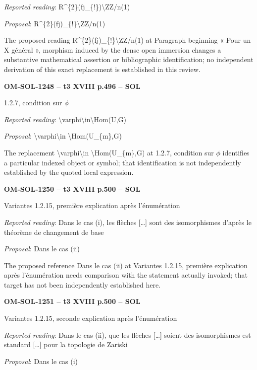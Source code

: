 \emph{Reported reading}: R\textasciicircum{}\{2\}(fj\_\{!\})\textbackslash{}ZZ/n(1)\par
\emph{Proposal}: R\textasciicircum{}\{2\}(fj)\_\{!\}\textbackslash{}ZZ/n(1)\par
The proposed reading R\textasciicircum{}\{2\}(fj)\_\{!\}\textbackslash{}ZZ/n(1) at Paragraph beginning « Pour un X général », morphism induced by the dense open immersion changes a substantive mathematical assertion or bibliographic identification; no independent derivation of this exact replacement is established in this review.\par
\par\noindent\textbf{OM-SOL-1248 -- t3 XVIII p.496 -- SOL}\par
1.2.7, condition sur \ensuremath{\phi}\par
\emph{Reported reading}: \textbackslash{}varphi\textbackslash{}in\textbackslash{}Hom(U,G)\par
\emph{Proposal}: \textbackslash{}varphi\textbackslash{}in \textbackslash{}Hom(U\_\{m\},G)\par
The replacement \textbackslash{}varphi\textbackslash{}in \textbackslash{}Hom(U\_\{m\},G) at 1.2.7, condition sur \ensuremath{\phi} identifies a particular indexed object or symbol; that identification is not independently established by the quoted local expression.\par
\par\noindent\textbf{OM-SOL-1250 -- t3 XVIII p.500 -- SOL}\par
Variantes 1.2.15, première explication après l'énumération\par
\emph{Reported reading}: Dans le cas (i), les flèches […] sont des isomorphismes d'après le théorème de changement de base\par
\emph{Proposal}: Dans le cas (ii)\par
The proposed reference Dans le cas (ii) at Variantes 1.2.15, première explication après l'énumération needs comparison with the statement actually invoked; that target has not been independently established here.\par
\par\noindent\textbf{OM-SOL-1251 -- t3 XVIII p.500 -- SOL}\par
Variantes 1.2.15, seconde explication après l'énumération\par
\emph{Reported reading}: Dans le cas (ii), que les flèches […] soient des isomorphismes est standard […] pour la topologie de Zariski\par
\emph{Proposal}: Dans le cas (i)\par
